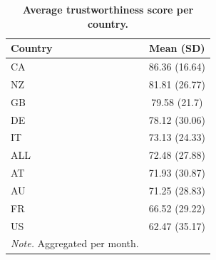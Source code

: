\begin{table}[H]
\centering
\caption{\textbf{Average trustworthiness score per country.}}
\label{table:table2}
\begin{tabularx}{\textwidth}{ X c }
\toprule
Country &     Mean (SD) \\
\midrule
     CA & 86.36 (16.64) \\
     NZ & 81.81 (26.77) \\
     GB &  79.58 (21.7) \\
     DE & 78.12 (30.06) \\
     IT & 73.13 (24.33) \\
    ALL & 72.48 (27.88) \\
     AT & 71.93 (30.87) \\
     AU & 71.25 (28.83) \\
     FR & 66.52 (29.22) \\
     US & 62.47 (35.17) \\
\bottomrule
\textit{Note.} Aggregated per month.
\end{tabularx}
\end{table}
